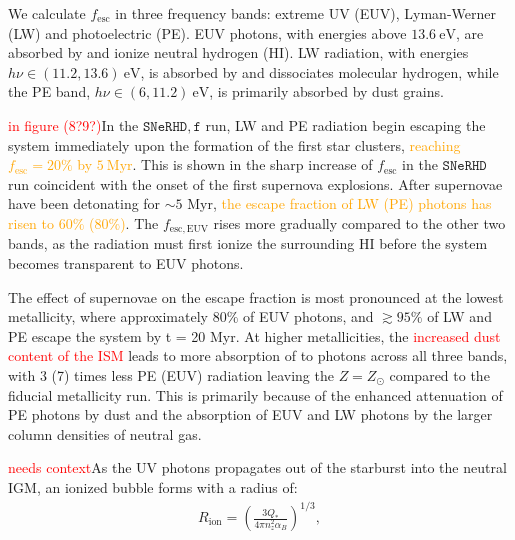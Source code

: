 \documentclass[twocolumn,linenumbers]{aastex631}
\begin{document}
We calculate $f_\mathrm{esc}$ in three frequency bands: extreme UV (EUV), Lyman-Werner (LW) and photoelectric (PE). EUV photons, with energies above $13.6\ \mathrm{eV}$, are absorbed by and ionize neutral hydrogen (HI). LW radiation, with energies $h\nu \in (11.2,13.6)\ \mathrm{eV}$, is absorbed by and dissociates molecular hydrogen, while the PE band, $h\nu \in (6,11.2)\ \mathrm{eV}$, is primarily absorbed by dust grains. 

\textcolor{red}{in figure (8?9?)}In the $\mathtt{SNeRHD,f}$ run, LW and PE radiation begin escaping the system immediately upon the formation of the first star clusters, \textcolor{orange}{reaching $f_\mathrm{esc} = 20\%$ by $5\ \mathrm{Myr}$}. This is shown in the sharp increase of $f_\mathrm{esc}$ in the $\mathtt{SNeRHD}$ run coincident with the onset of the first supernova explosions. After supernovae have been detonating for $\sim 5$ Myr, \textcolor{orange}{the escape fraction of LW (PE) photons has risen to $60\%$ ($80\%$)}. The $f_\mathrm{esc,EUV}$ rises more gradually compared to the other two bands, as the radiation must first ionize the surrounding HI before the system becomes transparent to EUV photons. 

The effect of supernovae on the escape fraction is most pronounced at the lowest metallicity, where approximately $80\%$ of EUV photons, and $\gtrsim 95\%$ of LW and PE escape the system by t = 20 Myr. At higher metallicities, the \textcolor{red}{increased dust content of the ISM} leads to more absorption of to photons across all three bands, with $3$ (7) times less PE (EUV) radiation leaving the $Z=Z_\odot$ compared to the fiducial metallicity run. This is primarily because of the enhanced attenuation of PE photons by dust and the absorption of EUV and LW photons by the larger column densities of neutral gas.

\textcolor{red}{needs context}As the UV photons propagates out of the starburst into the neutral IGM, an ionized bubble forms with a radius of:
\begin{align}
    R_\mathrm{ion} = \left(\frac{3Q_*}{4\pi n_z^2 \alpha_B}\right)^{1/3},
\end{align}
\end{document}
